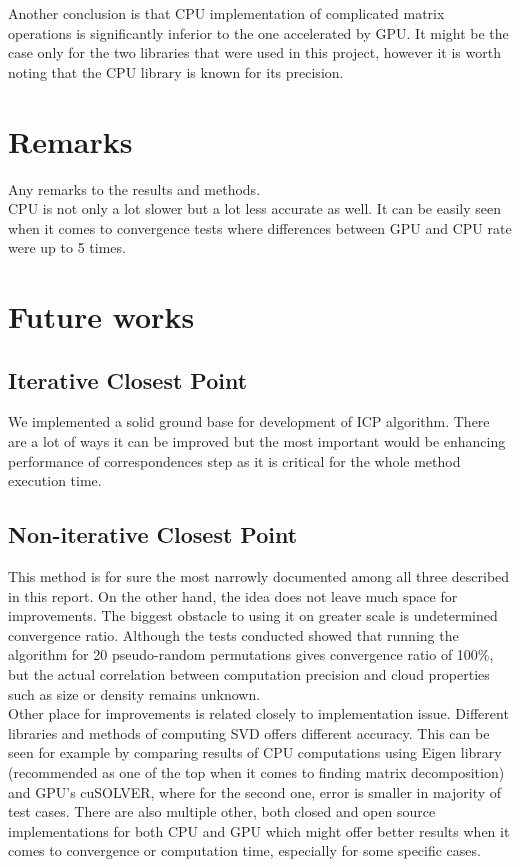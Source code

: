 \documentclass[titlepage]{article}
\begin{document}
Another conclusion is that CPU implementation of complicated matrix operations is significantly inferior to the one accelerated by GPU. It might be the case only for the two libraries that were used in this project, however it is worth noting that the CPU library is known for its precision.

\section{Remarks}
Any remarks to the results and methods.\\

CPU is not only a lot slower but a lot less accurate as well. It can be easily seen when it comes to convergence tests where differences between GPU and CPU rate were up to 5 times.

\section{Future works}

\subsection{Iterative Closest Point}
We implemented a solid ground base for development of ICP algorithm. There are a lot of ways it can be improved but the most important would be enhancing performance of correspondences step as it is critical for the whole method execution time. 

\subsection{Non-iterative Closest Point}
This method is for sure the most narrowly documented among all three described in this report. On the other hand, the idea does not leave much space for improvements. The biggest obstacle to using it on greater scale is undetermined convergence ratio. Although the tests conducted showed that running the algorithm for 20 pseudo-random permutations gives convergence ratio of 100\%, but the actual correlation between computation precision and cloud properties such as size or density remains unknown.\\
Other place for improvements is related closely to implementation issue. Different libraries and methods of computing SVD offers different accuracy. This can be seen for example by comparing results of CPU computations using Eigen library (recommended as one of the top when it comes to finding matrix decomposition) and GPU's cuSOLVER, where for the second one, error is smaller in majority of test cases. There are also multiple other, both closed and open source implementations for both CPU and GPU which might offer better results when it comes to convergence or computation time, especially for some specific cases.
\end{document}
